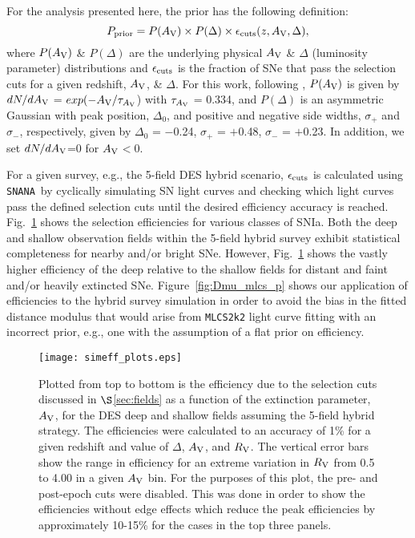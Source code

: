 \documentclass[preprint2]{aastex}    %
\newcommand\av{$A_{\rm V}$}
\newcommand\be{\begin{equation}}
\newcommand\ee{\end{equation}}
\newcommand{\mlcs}{{\tt MLCS2k2}}
\newcommand{\snana}{{\tt SNANA}}
\begin{document}
For the analysis presented here, the prior has the following definition:
\be
P_{\rm prior} = P(A_{\rm V})\times P(\Delta)\times\epsilon_{\rm cuts}(z,A_{\rm V},\Delta)\rm,
\label{eqn:prior}
\ee
where $P(A_{\rm V})$ \& $P(\Delta)$ are the underlying 
physical $A_{\rm V}$ \& $\Delta$ (luminosity parameter) distributions and $\epsilon_{\rm cuts}$ is the 
fraction of SNe that pass the selection cuts for a given redshift, $A_{\rm V}$, \& $\Delta$. 
For this work, following \cite{kes09}, $P(A_{\rm V})$ is given 
by $dN/dA_{\rm V}$ = $exp(-A_{\rm{V}}/\tau_{A_{\rm V}}$) with $\tau_{A_{\rm V}}$ = 0.334, and $P(\Delta)$ is an 
asymmetric Gaussian with peak position, $\Delta_0$, and positive and negative side 
widths, $\sigma_+$ and $\sigma_-$, respectively, given by $\Delta_0$ = $-$0.24, 
$\sigma_+$ = $+$0.48, $\sigma_-$ = $+$0.23. In addition, we set $dN/dA_{\rm V}$=0 for \av$<$0.

For a given survey, e.g., the 5-field DES hybrid scenario, $\epsilon_{\rm cuts}$ is calculated 
using \snana\ by cyclically simulating SN light curves and checking which light curves pass the 
defined selection cuts until the desired efficiency accuracy is reached.
Fig.~\ref{fig:eff} shows the selection efficiencies for various classes of SNIa. 
Both the deep and shallow observation fields within the 5-field hybrid survey exhibit statistical 
completeness for nearby and/or bright SNe. However, 
Fig.~\ref{fig:eff} shows the vastly higher efficiency of the deep relative to the shallow fields for 
distant and faint and/or heavily extincted SNe. Figure~\ref{fig:Dmu_mlcs_p} shows our application 
of efficiencies to the hybrid survey simulation in order to avoid the bias in the fitted distance 
modulus that would arise from {\mlcs} light curve fitting with an incorrect prior, e.g., one with 
the assumption of a flat prior on efficiency.

\begin{figure}
\begin{center}
\texttt{[image: simeff\_plots.eps]}
\caption{Plotted from top to bottom is the efficiency due to the selection cuts 
discussed in $\S$\ref{sec:fields} as a function of the extinction parameter, $A_{\rm V}$, 
for the DES deep and shallow fields assuming the 5-field hybrid strategy. 
The efficiencies were calculated to an accuracy 
of 1\% for a given redshift and value of $\Delta$, $A_{\rm V}$, and $R_{\rm V}$. 
The vertical error bars show the range in efficiency for an extreme variation in $R_{\rm V}$  
from 0.5 to 4.00 in a given $A_{\rm V}$ bin. For the purposes of this plot, the 
pre- and post-epoch cuts were disabled. This was done in order to show the efficiencies 
without edge 
effects which reduce the peak efficiencies by approximately 10-15\% for the 
cases in the top three panels.
}
\label{fig:eff}
\end{center}
\end{figure}
\end{document}
